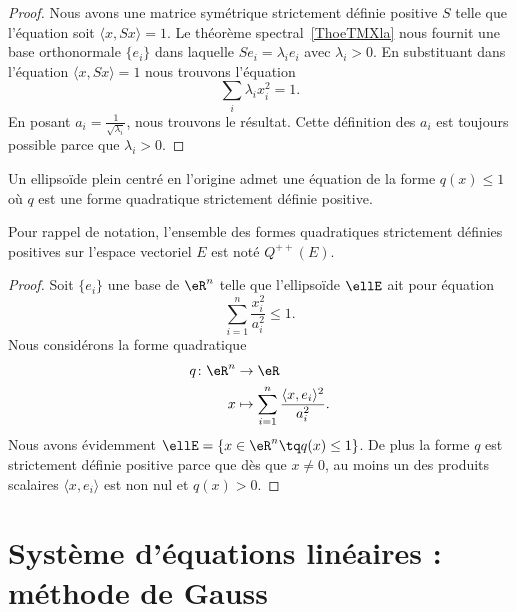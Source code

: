 \begin{proof}
    Nous avons une matrice symétrique strictement définie positive \( S\) telle que l'équation soit \( \langle x, Sx\rangle =1\). Le théorème spectral~\ref{ThoeTMXla} nous fournit une base orthonormale \( \{ e_i \}\) dans laquelle \( Se_i=\lambda_ie_i\) avec \( \lambda_i>0\). En substituant dans l'équation \( \langle x, Sx\rangle =1\) nous trouvons l'équation
    \begin{equation}
        \sum_i\lambda_ix_i^2=1.
    \end{equation}
    En posant \( a_i=\frac{1}{ \sqrt{\lambda_i} }\), nous trouvons le résultat.  Cette définition des \( a_i\) est toujours possible parce que \( \lambda_i>0\).
\end{proof}

\begin{corollary}   \label{CorKGJooOmcBzh}
    Un ellipsoïde plein centré en l'origine admet une équation de la forme \( q(x)\leq 1\) où \( q\) est une forme quadratique strictement définie positive.
\end{corollary}
Pour rappel de notation, l'ensemble des formes quadratiques strictement définies positives sur l'espace vectoriel \( E\) est noté \( Q^{++}(E)\).

\begin{proof}
    Soit \( \{ e_i \}\) une base de \( \eR^n\) telle que l'ellipsoïde \( \ellE\) ait pour équation
    \begin{equation}
        \sum_{i=1}^n\frac{ x_i^2 }{ a_i^2 }\leq 1.
    \end{equation}
    Nous considérons la forme quadratique
    \begin{equation}
        \begin{aligned}
            q\colon \eR^n&\to \eR \\
            x&\mapsto \sum_{i=1}^n\frac{ \langle x, e_i\rangle^2 }{ a_i^2 }.
        \end{aligned}
    \end{equation}
    Nous avons évidemment \( \ellE=\{ x\in \eR^n\tq q(x)\leq 1 \}\). De plus la forme \( q\) est strictement définie positive parce que dès que \( x\neq 0\), au moins un des produits scalaires \( \langle x, e_i\rangle \) est non nul et \( q(x)> 0\).
\end{proof}

\section{Système d'équations linéaires : méthode de Gauss}

